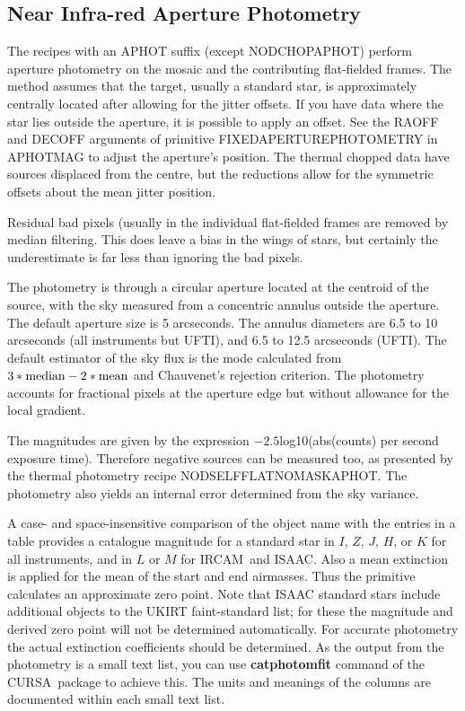 \documentclass[twoside,11pt]{article}
\newcommand{\htmladdnormallink}[2]{#1}
\newcommand{\htmlref}[2]{#1}
\newcommand{\xref}[3]{#1}
\newcommand{\xlabel}[1]{}
\renewcommand{\_}{\texttt{\symbol{95}}}
\newcommand{\lsk}{\raisebox{-0.4ex}{\rm *}}
\newcommand{\CURSA}{{\footnotesize CURSA}}
\newcommand{\IRCAM}{\htmladdnormallink{IRCAM}{http://www.jach.hawaii.edu/JACpublic/UKIRT/instruments/ircam/ircam3.html}}
\newcommand{\ISAAC}{\htmladdnormallink{ISAAC}{http://www.eso.org/instruments/isaac/}}
\newcommand{\UFTI}{\htmladdnormallink{UFTI}{http://www.jach.hawaii.edu/JACpublic/UKIRT/instruments/ufti/ufti.html}}
\begin{document}
\subsection{\xlabel{near_infra-red_aperture_photometry}Near Infra-red Aperture
Photometry\label{near_infra-red_aperture_photometry}}

The recipes with an \_APHOT suffix (except
\htmlref{NOD\_CHOP\_APHOT}{NOD\_CHOP\_APHOT}) perform aperture
photometry on the mosaic and the contributing flat-fielded frames.
The method assumes that the target, usually a standard star, is
approximately centrally located after allowing for the jitter offsets.
If you have data where the star lies outside the aperture, it is
possible to apply an offset.  See the RAOFF and DECOFF arguments of
primitive \_FIXED\_APERTURE\_PHOTOMETRY\_ in \_APHOT\_MAG\_ to adjust
the aperture's position.  The thermal
\htmlref{chopped}{chopping} data have sources displaced from the centre, but
the reductions allow for the symmetric offsets about the mean jitter
position.

Residual bad pixels (usually in the individual flat-fielded frames
are removed by median filtering.  This does leave a bias in the wings
of stars, but certainly the underestimate is far less than ignoring
the bad pixels.

The photometry is through a circular aperture located at the centroid
of the source, with the sky measured from a concentric annulus outside
the aperture.  The default aperture size is 5 arcseconds.  The annulus
diameters are 6.5 to 10 arcseconds (all instruments but UFTI), and 6.5
to 12.5 arcseconds (\UFTI).  The default estimator of the sky flux is
the mode calculated from $3*{\rm median}-2*{\rm mean}$ and Chauvenet's
rejection criterion.  The photometry accounts for fractional pixels at
the aperture edge but without allowance for the local gradient.

The magnitudes are given by the expression $-2.5 $\lsk$
$log10(abs(counts) per second exposure time).  Therefore negative
sources can be measured too, as presented by the thermal photometry
recipe \htmlref{NOD\_SELF\_FLAT\_NO\_MASK\_APHOT}{NOD\_SELF\_FLAT\_NO\_MASK\_APHOT}.
The photometry also yields an internal error determined from
the sky variance.

A case- and space-insensitive comparison of the object name with the
entries in a table provides a catalogue magnitude for a standard star
in $I$, $Z$, $J$, $H$, or $K$ for all instruments, and in $L$ or $M$
for \IRCAM\ and \ISAAC.  Also a mean extinction is applied for the mean
of the start and end airmasses.  Thus the primitive calculates an
approximate zero point.  Note that ISAAC standard stars include additional
objects to the \htmladdnormallink{UKIRT faint-standard
list}{http://www.jach.hawaii.edu/JACpublic/UKIRT/astronomy/calib/faint_stds.html};
for these the magnitude and
derived zero point will not be determined automatically.  For accurate
photometry the actual extinction coefficients should be determined.
As the output from the photometry is a \xref{small text
list}{sun190}{STLREF}, you can use
\xref{{\bf catphotomfit} command}{sun190}{PHOTCAL} of the \CURSA\ package
to achieve this.  The units and meanings of the columns are documented
within each small text list.
\end{document}

